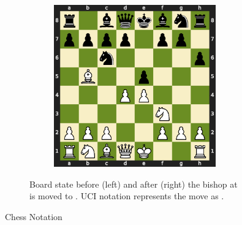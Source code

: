 \begin{figure}
\begin{subfigure}{0.63\textwidth}
\begin{subfigure}{0.43\textwidth}
\end{subfigure}
\hspace*{\fill}
\begin{subfigure}{0.43\textwidth}
   \vspace{.2in}\includegraphics[width=\linewidth]{figures/board_next.pdf}
\end{subfigure}
\vspace{.1in}
\caption{Board state before (left) and after (right) the bishop at  is moved to . UCI notation represents the move as .}
\label{fig:move_notation}
\end{subfigure}
\vspace{-0.05in}
\caption{
Chess Notation %
}
\end{figure}
